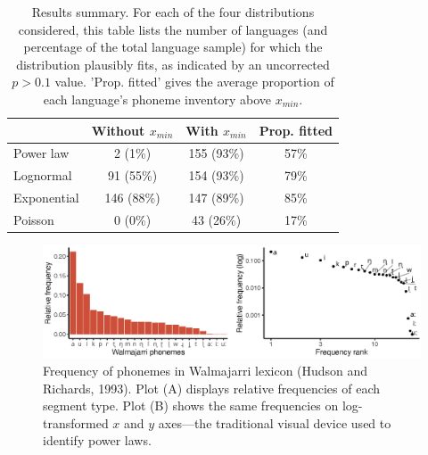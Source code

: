 \begin{table}[!h]

\caption{\label{tab:results-summary}Results summary. For each of the four distributions considered, this table lists the number of languages (and percentage of the total language sample) for which the distribution plausibly fits, as indicated by an uncorrected $p > 0.1$ value. 'Prop. fitted' gives the average proportion of each language's phoneme inventory above $x_{min}$.}
\centering
\begin{tabular}[t]{lccc}
\toprule
\textbf{ } & \textbf{Without $x_{min}$} & \textbf{With $x_{min}$} & \textbf{Prop. fitted}\\
\midrule
Power law & 2 (1\%) & 155 (93\%) & 57\%\\
Lognormal & 91 (55\%) & 154 (93\%) & 79\%\\
Exponential & 146 (88\%) & 147 (89\%) & 85\%\\
Poisson & 0 (0\%) & 43 (26\%) & 17\%\\
\bottomrule
\end{tabular}
\end{table}

\begin{figure}

{\centering \includegraphics[width=180mm]{fig/Fig1_walmajarri} 

}

\caption{Frequency of phonemes in Walmajarri lexicon (Hudson and Richards, 1993). Plot (A) displays relative frequencies of each segment type. Plot (B) shows the same frequencies on log-transformed \(x\) and \(y\) axes---the traditional visual device used to identify power laws.}\label{fig:Figure-1}
\end{figure}



